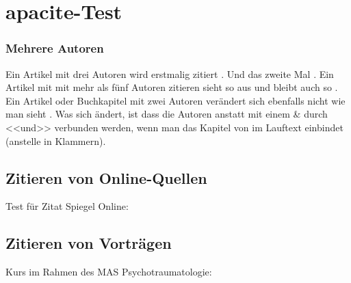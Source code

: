 \documentclass[a4paper,DIV13]{scrartcl}
\begin{document}
\section{apacite-Test}

\subsubsection{Mehrere Autoren}
Ein Artikel mit drei Autoren wird erstmalig zitiert \cite{Hembree2003b}. Und das zweite Mal \cite{Hembree2003b}.
Ein Artikel mit mit mehr als fünf Autoren zitieren sieht so aus \cite{Kupfer1992} und bleibt auch so \cite{Kupfer1992}.
Ein Artikel oder Buchkapitel mit zwei Autoren verändert sich ebenfalls nicht \cite{Cahill2007} wie man sieht \cite{Cahill2007}.
Was sich ändert, ist dass die Autoren anstatt mit einem \& durch <<und>> verbunden werden, wenn man das Kapitel von  im Lauftext einbindet (anstelle in Klammern).

\subsection{Zitieren von Online-Quellen}
Test für Zitat Spiegel Online: \cite{Seidler2011}


\subsection{Zitieren von Vorträgen}

\cite{Zaudig2011}

Kurs im Rahmen des MAS Psychotraumatologie: \cite{Landolt2011, Landolt2011b}


\renewcommand{\BCHAIR}{Vorsitz}

\end{document}
